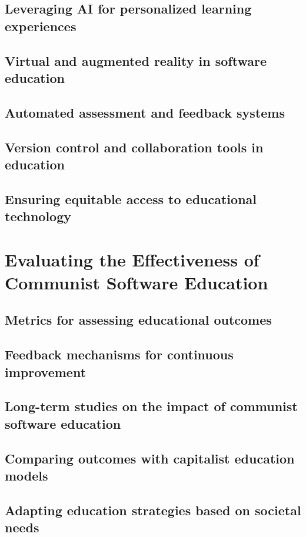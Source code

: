 \subsection{Leveraging AI for personalized learning experiences}
\subsection{Virtual and augmented reality in software education}
\subsection{Automated assessment and feedback systems}
\subsection{Version control and collaboration tools in education}
\subsection{Ensuring equitable access to educational technology}

\newpage

\section{Evaluating the Effectiveness of Communist Software Education}
\subsection{Metrics for assessing educational outcomes}
\subsection{Feedback mechanisms for continuous improvement}
\subsection{Long-term studies on the impact of communist software education}
\subsection{Comparing outcomes with capitalist education models}
\subsection{Adapting education strategies based on societal needs}

